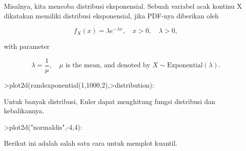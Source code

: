 \documentclass[a4paper,10pt]{article}
\begin{document}
\begin{eulernotebook}
\begin{eulercomment}
\begin{eulercomment}
\begin{eulercomment}
\begin{eulercomment}
\begin{eulercomment}
\begin{eulercomment}
\begin{eulercomment}
\begin{eulercomment}
\begin{eulercomment}
\begin{eulercomment}
\begin{eulercomment}
\begin{eulercomment}
\begin{eulercomment}
\begin{eulercomment}
\begin{eulercomment}
\begin{eulercomment}
\begin{eulercomment}
\begin{eulercomment}
\begin{eulercomment}
\begin{eulercomment}
\begin{eulercomment}
\begin{eulercomment}
\begin{eulercomment}
\begin{eulercomment}
\begin{eulercomment}
\begin{eulercomment}
\begin{eulercomment}
\begin{eulercomment}
\begin{eulercomment}
\begin{eulercomment}
\begin{eulercomment}
\begin{eulercomment}
\begin{eulercomment}
\begin{eulercomment}
\begin{eulercomment}
\begin{eulercomment}
\begin{eulercomment}
\begin{eulercomment}
\begin{eulercomment}
\begin{eulercomment}
\begin{eulercomment}
\begin{eulercomment}
\begin{eulercomment}
\begin{eulercomment}
\begin{eulercomment}
Misalnya, kita mencoba distribusi eksponensial. Sebuah variabel acak
kontinu X dikatakan memiliki distribusi eksponensial, jika PDF-nya
diberikan oleh

\end{eulercomment}
\begin{eulerformula}
\[
f_X(x)=\lambda e^{-\lambda x},\quad x>0,\quad \lambda>0,
\]
\end{eulerformula}
\begin{eulercomment}
with parameter\\
\end{eulercomment}
\begin{eulerformula}
\[
\lambda=\frac{1}{\mu},\quad \mu \text{ is the mean, and denoted by } X \sim \text{Exponential}(\lambda).
\]
\end{eulerformula}
\begin{eulerprompt}
>plot2d(randexponential(1,1000,2),>distribution):
\end{eulerprompt}
\begin{eulercomment}
Untuk banyak distribusi, Euler dapat menghitung fungsi distribusi dan
kebalikannya.
\end{eulercomment}
\begin{eulerprompt}
>plot2d("normaldis",-4,4): 
\end{eulerprompt}
\begin{eulercomment}
Berikut ini adalah salah satu cara untuk memplot kuantil.
\end{eulercomment}

\end{eulercomment}
\end{eulercomment}
\end{eulercomment}
\end{eulercomment}
\end{eulercomment}
\end{eulercomment}
\end{eulercomment}
\end{eulercomment}
\end{eulercomment}
\end{eulercomment}
\end{eulercomment}
\end{eulercomment}
\end{eulercomment}
\end{eulercomment}
\end{eulercomment}
\end{eulercomment}
\end{eulercomment}
\end{eulercomment}
\end{eulercomment}
\end{eulercomment}
\end{eulercomment}
\end{eulercomment}
\end{eulercomment}
\end{eulercomment}
\end{eulercomment}
\end{eulercomment}
\end{eulercomment}
\end{eulercomment}
\end{eulercomment}
\end{eulercomment}
\end{eulercomment}
\end{eulercomment}
\end{eulercomment}
\end{eulercomment}
\end{eulercomment}
\end{eulercomment}
\end{eulercomment}
\end{eulercomment}
\end{eulercomment}
\end{eulercomment}
\end{eulercomment}
\end{eulercomment}
\end{eulercomment}
\end{eulercomment}
\end{eulernotebook}
\end{document}

